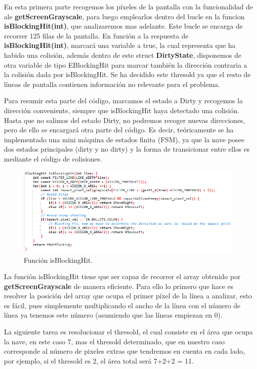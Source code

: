 En esta primera parte recogemos los píxeles de la pantalla con la funcionalidad de \ac{ale} \textbf{getScreenGrayscale}, para luego emplearlos dentro del bucle en la funcion \textbf{isBlockingHit(int)}, que analizaremos mas adelante. Este bucle se encarga de recorrer 125 filas de la pantalla. En función a la respuesta de \textbf{isBlockingHit(int)}, marcará una variable a true, la cual representa que ha habido una colisión, además dentro de este struct \textbf{DirtyState}, disponemos de otra variable de tipo EBlockingHit para marcar también la dirección contraria a la colisión dada por isBlockingHit. Se ha decidido este thresold ya que el resto de líneas de pantalla contienen información no relevante para el problema.

Para resumir esta parte del código, marcamos el estado a Dirty y recogemos la dirección conveniente, siempre que isBlockingHit haya detectado una colisión. Hasta que no salimos del estado Dirty, no podremos recoger nuevas direcciones, pero de ello se encargará otra parte del código. Es decir, teóricamente se ha implementado una mini máquina de estados finita (FSM), ya que la nave posee dos estados principales (dirty y no dirty) y la forma de transicionar entre ellos es mediante el código de colisiones.

\newpage
\begin{figure}[h]
	\centering
	\includegraphics[width=1\textwidth]{Figures/daisblocking}
	\caption{Función isBlockingHit.}
	\label{fig:daisblocking}
\end{figure}

La función isBlockingHit tiene que ser capaz de recorrer el array obtenido por \textbf{getScreenGrayscale} de manera eficiente. Para ello lo primero que hace es resolver la posición del array que ocupa el primer píxel de la línea a analizar, esto es fácil, pues simplemente multiplicando el ancho de la línea con el número de línea ya tenemos este número (asumiendo que las líneas empiezan en 0).

La siguiente tarea es resolucionar el thresold, el cual consiste en el área que ocupa la nave, en este caso 7, mas el thresold determinado, que en nuestro caso corresponde al número de pixeles extras que tendremos en cuenta en cada lado, por ejemplo, si el thresold es 2, el área total será 7+2+2 = 11.

